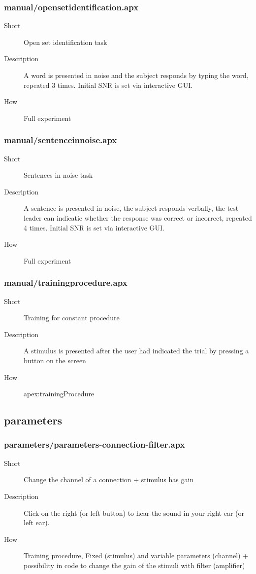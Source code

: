 \subsubsection{manual/opensetidentification.apx}
\begin{description}
\item[Short] 
 Open set identification task
\item[Description] 
 A word is presented in noise and the subject responds by typing the word, repeated 3 times. Initial SNR is set via interactive GUI.
\item[How] 
 Full experiment
\end{description}

\subsubsection{manual/sentenceinnoise.apx}
\begin{description}
\item[Short] 
 Sentences in noise task
\item[Description] 
 A sentence is presented in noise, the subject responds verbally, the test leader can indicatie whether the response was correct or incorrect, repeated 4 times. Initial SNR is set via interactive GUI.
\item[How] 
 Full experiment
\end{description}

\subsubsection{manual/trainingprocedure.apx}
\begin{description}
\item[Short] 
 Training for constant procedure
\item[Description] 
 A stimulus is presented after the user had indicated the trial by pressing a button on the screen
\item[How] 
 apex:trainingProcedure
\end{description}

\subsection{parameters}
\subsubsection{parameters/parameters-connection-filter.apx}
\begin{description}
\item[Short] 
 Change the channel of a connection + stimulus has gain
\item[Description] 
 Click on the right (or left button) to hear the sound in your right ear (or left ear).
\item[How] 
 Training procedure, Fixed (stimulus) and variable parameters (channel) + possibility in code to change the gain of the stimuli with filter (amplifier)
\end{description}

